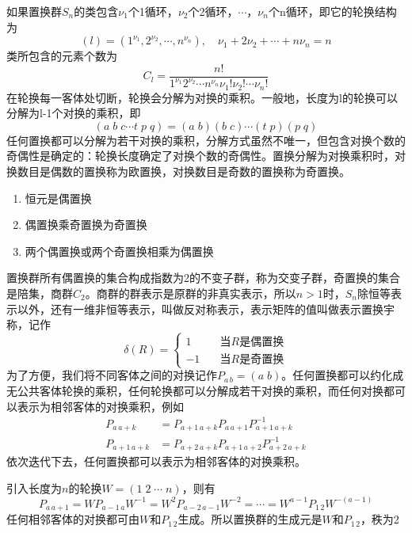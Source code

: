 \documentclass[12pt]{article}
\begin{document}
如果置换群$S_n$的类包含$\nu_1$个1循环，$\nu_2$个2循环，$\cdots$，$\nu_n$个n循环，即它的轮换结构为
\begin{equation*}
    (l)=(1^{\nu_1},2^{\nu_2},\cdots,n^{\nu_n}),\quad \nu_1+2\nu_2+\cdots+n\nu_n=n
\end{equation*}
类所包含的元素个数为
\begin{equation*}
    C_l=\frac{n!}{1^{\nu_1}2^{\nu_2}\cdots n^{\nu_n}\nu_1!\nu_2!\cdots\nu_n!}
\end{equation*}
在轮换每一客体处切断，轮换会分解为对换的乘积。一般地，长度为l的轮换可以分解为l-1个对换的乘积，即
\begin{equation*}
    (a\;b\;c\cdots t\;p\;q)=(a\;b)(b\;c)\cdots(t\;p)(p\;q)
\end{equation*}
任何置换都可以分解为若干对换的乘积，分解方式虽然不唯一，但包含对换个数的奇偶性是确定的：轮换长度确定了对换个数的奇偶性。置换分解为对换乘积时，对换数目是偶数的置换称为欧置换，对换数目是奇数的置换称为奇置换。
\begin{enumerate}
    \item 恒元是偶置换
    \item 偶置换乘奇置换为奇置换
    \item 两个偶置换或两个奇置换相乘为偶置换
\end{enumerate}
置换群所有偶置换的集合构成指数为2的不变子群，称为交变子群，奇置换的集合是陪集，商群$C_2$。商群的群表示是原群的非真实表示，所以$n>1$时，$S_n$除恒等表示以外，还有一维非恒等表示，叫做反对称表示，表示矩阵的值叫做表示置换宇称，记作
\begin{equation*}
    \delta(R)=\begin{cases}
        1\quad&\text{当$R$是偶置换}\\
        -1\quad&\text{当$R$是奇置换}
    \end{cases}
\end{equation*}
为了方便，我们将不同客体之间的对换记作$P_{a\,b}=(a\;b)$。任何置换都可以约化成无公共客体轮换的乘积，任何轮换都可以分解成若干对换的乘积，而任何对换都可以表示为相邻客体的对换乘积，例如
\begin{equation*}
    \begin{split}
        P_{a\,a+k}&=P_{a+1\,a+k}P_{a\,a+1}P_{a+1\,a+k}^{-1}\\
        P_{a+1\,a+k}&=P_{a+2\,a+k}P_{a+1\,a+2}P_{a+2\,a+k}^{-1}
    \end{split}
\end{equation*}
依次迭代下去，任何置换都可以表示为相邻客体的对换乘积。

引入长度为$n$的轮换$W=(1\;2\;\cdots\;n)$，则有
\begin{equation*}
    P_{a\,a+1}=WP_{a-1\,a}W^{-1}=W^2P_{a-2\,a-1}W^{-2}=\cdots=W^{a-1}P_{1\,2}W^{-(a-1)}
\end{equation*}
任何相邻客体的对换都可由$W$和$P_{1\,2}$生成。所以置换群的生成元是$W$和$P_{1\,2}$，秩为2
\end{document}
